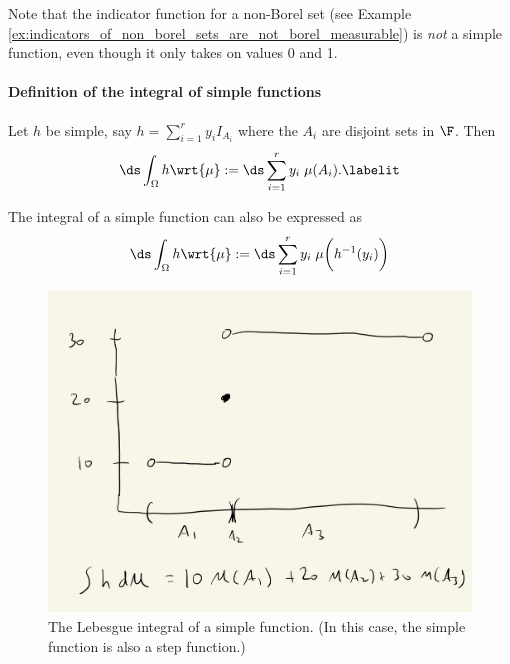 \documentclass{article} %
\begin{document}
\begin{remark}
Note that the indicator function for a non-Borel set (see Example \ref{ex:indicators_of_non_borel_sets_are_not_borel_measurable}) is \textit{not} a simple function, even though it only takes on values 0 and 1. 
\end{remark}

\paragraph{Definition of the integral of simple functions}

\begin{definition}
Let $h$ be simple, say $h = \sum_{i=1}^r y_i I_{A_i}$ where the $A_i$ are disjoint sets in $\F$.  Then
\begin{align*}
\ds\int_{\Omega} h \wrt{\mu} := \ds\sum_{i=1}^r y_i \; \mu(A_i).
\labelit \label{eqn:integral_of_simple_function}	
\end{align*}
 \label{def:integral_of_simple_function}
\end{definition}

The integral of a simple function can also be expressed as 
\[\ds\int_{\Omega} h \wrt{\mu} := \ds\sum_{i=1}^r y_i \; \mu \bigg( h^{-1}(y_i) \bigg) \]

\begin{figure}[H]
\centering 
\includegraphics[width=.5\textwidth]{images/integral_of_simple_function}	
\caption{The Lebesgue integral of a simple function. {\scriptsize (In this case, the simple function is also a step function.)}}
\end{figure}
\end{document}
